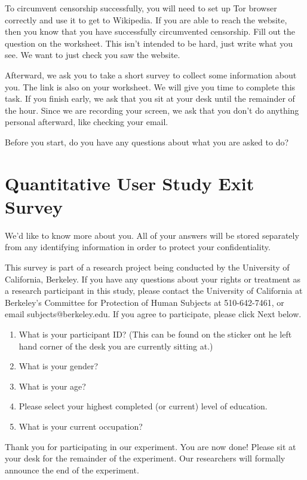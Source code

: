 \documentclass{template}
\begin{document}
To circumvent censorship successfully, you will need to set up Tor browser correctly and use it to get to Wikipedia. If you are able to reach the website, then you know that you have successfully circumvented censorship. Fill out the question on the worksheet. This isn’t intended to be hard, just write what you see. We want to just check you saw the website. 

Afterward, we ask you to take a short survey to collect some information about you. The link is also on your worksheet.
We will give you time to complete this task. If you finish early, we ask that you sit at your desk until the remainder of the hour. Since we are recording your screen, we ask that you don't do anything personal afterward, like checking your email.

Before you start, do you have any questions about what you are asked to do? 

\section{Quantitative User Study Exit Survey} 
We'd like to know more about you.  All of your answers will be stored separately from any identifying information in order to protect your confidentiality.

This survey is part of a research project being conducted by the University of California, Berkeley. If you have any questions about your rights or treatment as a research participant in this study, please contact the University of California at Berkeley's Committee for Protection of Human Subjects at 510-642-7461, or email subjects@berkeley.edu. If you agree to participate, please click Next below.

\begin{enumerate} \itemsep1pt \parskip0pt  
\item{What is your participant ID? (This can be found on the sticker ont he left hand corner of the desk you are currently sitting at.)}
\item{What is your gender?}
\item{What is your age?}
\item{Please select your highest completed (or current) level of education}.
\item{What is your current occupation?}  
\end{enumerate}

Thank you for participating in our experiment. You are now done! Please sit at your desk for the remainder of the experiment. Our researchers will formally announce the end of the experiment. 
\end{document}
